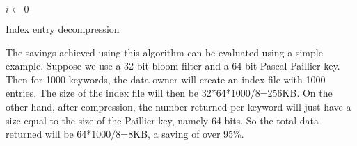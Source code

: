 \begin{algorithm}
 $i \gets 0 $\;
\;
 \caption{Index entry decompression}
  \vspace{-3px}

 \label{algo:decomp}
\end{algorithm}


The savings achieved using this algorithm can be evaluated using a simple example.
Suppose we use a 32-bit bloom filter and a 64-bit Pascal Paillier key.
Then for 1000 keywords, the data owner will create an index file with 1000 entries.
The size of the index file will then be 32*64*1000/8=256KB. On the other hand,
after compression, the number returned per keyword will just have a size equal to the
size of the Paillier key, namely 64 bits. So the total data returned will be 
64*1000/8=8KB, a saving of over 95\%.
